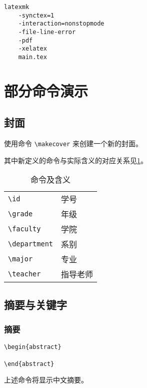 \documentclass{hainanuthesis}
\begin{document}
\begin{verbatim}
latexmk
    -synctex=1
    -interaction=nonstopmode
    -file-line-error
    -pdf
    -xelatex
    main.tex
\end{verbatim}

\section{部分命令演示}

\subsection{封面}

使用命令
\verb|\makecover|
来创建一个新的封面。

其中新定义的命令与实际含义的对应关系见\cref{tb:02}。

\begin{table}[!htbp]
    \begin{center}
        \caption{命令及含义}
        \label{tb:02}
        \begin{tabular}{ll}
            \verb|\id|         & 学号     \\
            \verb|\grade|      & 年级     \\
            \verb|\faculty|    & 学院     \\
            \verb|\department| & 系别     \\
            \verb|\major|      & 专业     \\
            \verb|\teacher|    & 指导老师 \\
        \end{tabular}
    \end{center}
\end{table}

\subsection{摘要与关键字}

\subsubsection{摘要}
\begin{verbatim}
\begin{abstract}

\end{abstract}
\end{verbatim}

上述命令将显示中文摘要。
\end{document}

